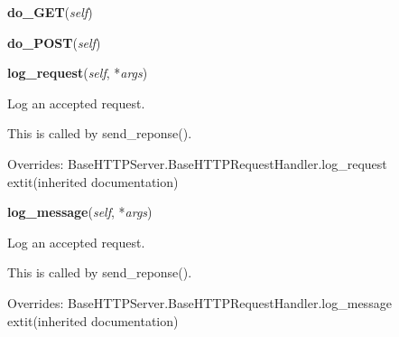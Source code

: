    \vspace{0.5ex}

    \begin{boxedminipage}{\textwidth}

    \raggedright \textbf{do\_GET}(\textit{self})

    \end{boxedminipage}

    \label{pydsp:pydspWebServer:do_POST}

    \vspace{0.5ex}

    \begin{boxedminipage}{\textwidth}

    \raggedright \textbf{do\_POST}(\textit{self})

    \end{boxedminipage}

    \vspace{0.5ex}

    \begin{boxedminipage}{\textwidth}

    \raggedright \textbf{log\_request}(\textit{self}, *\textit{args})

    Log an accepted request.

    This is called by send\_reponse().

    \vspace{1ex}

      Overrides: BaseHTTPServer.BaseHTTPRequestHandler.log\_request 	extit{(inherited documentation)}

    \end{boxedminipage}

    \vspace{0.5ex}

    \begin{boxedminipage}{\textwidth}

    \raggedright \textbf{log\_message}(\textit{self}, *\textit{args})

    Log an accepted request.

    This is called by send\_reponse().

    \vspace{1ex}

      Overrides: BaseHTTPServer.BaseHTTPRequestHandler.log\_message 	extit{(inherited documentation)}

    \end{boxedminipage}

